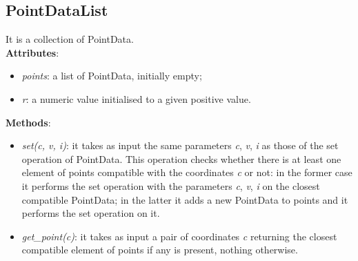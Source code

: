 \documentclass[a4paper,12pt,oneside]{book}
\begin{document}
\begin{onehalfspace}
    \subsection{PointDataList}
    	It is a collection of PointData. \\
    	\textbf{Attributes}:
    	\begin{itemize}
    	    \setlength\itemsep{0em}
    	    \item \textit{points}: a list of PointData, initially empty;
        	\item \textit{r}: a numeric value initialised to a given positive value.
    	\end{itemize}
    	\textbf{Methods}:
    	    \begin{itemize}
    	    \setlength\itemsep{0em}
        	\item \textit{set(c, v, i)}: it takes as input the same parameters \textit{c}, \textit{v}, \textit{i} as those of the set operation of PointData. This	operation checks whether there is at least one element of points compatible with the coordinates \textit{c} or not:
        	in the former case it performs the set operation with the parameters \textit{c}, \textit{v}, \textit{i} on the closest compatible
        	PointData; in the latter it adds a new PointData to points and it performs the set operation on it.
        	\item \textit{get\_point(c)}: it takes as input a pair of coordinates \textit{c} returning the closest compatible element of points if any is present, nothing otherwise.
        	\end{itemize}

\end{onehalfspace}
\end{document}
